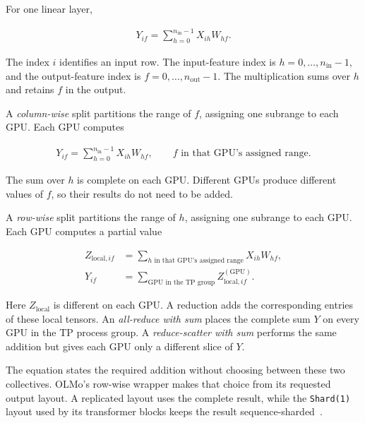 \documentclass[11pt]{article}
\begin{document}
For one linear layer,

\begin{equation}
\begin{split}
Y_{if}=\sum_{h=0}^{n_{\mathrm{in}}-1}X_{ih}W_{hf}.
\end{split}
\end{equation}

The index \(i\) identifies an input row.  The input-feature index is
\(h=0,\ldots,n_{\mathrm{in}}-1\), and the output-feature index is
\(f=0,\ldots,n_{\mathrm{out}}-1\).  The multiplication sums over \(h\) and
retains \(f\) in the output.

A \emph{column-wise} split partitions the range of \(f\), assigning one
subrange to each GPU.  Each GPU computes

\begin{equation}
\begin{split}
Y_{if}=\sum_{h=0}^{n_{\mathrm{in}}-1}X_{ih}W_{hf},
\qquad f\text{ in that GPU's assigned range}.
\end{split}
\end{equation}

The sum over \(h\) is complete on each GPU.  Different GPUs produce different
values of \(f\), so their results do not need to be added.

A \emph{row-wise} split partitions the range of \(h\), assigning one subrange
to each GPU.  Each GPU computes a partial value

\begin{equation}
\begin{split}
Z_{\mathrm{local},if}
&=\sum_{h\text{ in that GPU's assigned range}}X_{ih}W_{hf},\\
Y_{if}&=\sum_{\text{GPU in the TP group}}
Z^{(\text{GPU})}_{\mathrm{local},if}.
\end{split}
\end{equation}

Here \(Z_{\mathrm{local}}\) is different on each GPU.  A reduction adds the
corresponding entries of these local tensors.  An \emph{all-reduce with sum}
places the complete sum \(Y\) on every GPU in the TP process group.  A
\emph{reduce-scatter with sum} performs the same addition but gives each GPU
only a different slice of \(Y\).

The equation states the required addition without choosing between these two
collectives.  OLMo's row-wise wrapper makes that choice from its requested
output layout.  A replicated layout uses the complete result, while the
\texttt{Shard(1)} layout used by its transformer blocks keeps the result
sequence-sharded~\cite{olmo-feed-forward,olmo-transformer-block}.
\end{document}
